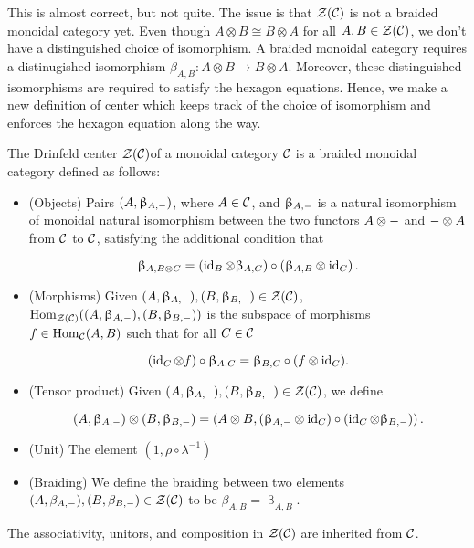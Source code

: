 This is almost correct, but not quite. The issue is that ${\mathcal Z}({\mathcal C})$ is not a braided monoidal category yet. Even though $A\otimes B\cong B\otimes A$ for all $A,B\in {\mathcal Z}({\mathcal C})$, we don't have a distinguished choice of isomorphism. A braided monoidal category requires a distinugished isomorphism $\beta_{A,B}:A\otimes B\xrightarrow{} B\otimes A$. Moreover, these distinguished isomorphisms are required to satisfy the hexagon equations. Hence, we make a new definition of center which keeps track of the choice of isomorphism and enforces the hexagon equation along the way.


\begin{defn} The Drinfeld center ${\mathcal Z}({\mathcal C})$of a monoidal category ${\mathcal C}$ is a braided monoidal category defined as follows:

\begin{itemize}
\item (Objects) Pairs $(A,\upbeta_{A,\--})$, where $A\in {\mathcal C}$, and $\upbeta_{A,\--}$ is a natural isomorphism of monoidal natural isomorphism between the two functors $A\otimes \--$ and $\--\otimes A$ from ${\mathcal C}$ to ${\mathcal C}$, satisfying the additional condition that

$$\upbeta_{A,B\otimes C}=\left(\operatorname{id}_{B}\otimes \upbeta_{A,C}\right)\circ \left(\upbeta_{A,B}\otimes \operatorname{id}_C\right).$$

\item (Morphisms) Given $(A,\upbeta_{A,\--}), (B,\upbeta_{B,\--})\in {\mathcal Z}({\mathcal C})$, $\operatorname{Hom}_{{\mathcal Z}({\mathcal C})}((A,\upbeta_{A,\--}),(B,\upbeta_{B,\--}))$ is the subspace of morphisms $f\in \operatorname{Hom}_{{\mathcal C}}(A,B)$ such that for all $C\in {\mathcal C}$

$$\left(\operatorname{id}_{C}\otimes f\right)\circ \upbeta_{A,C}=\upbeta_{B,C}\circ (f\otimes \operatorname{id}_C).$$

\item (Tensor product) Given $(A,\upbeta_{A,\--}), (B,\upbeta_{B,\--})\in {\mathcal Z}({\mathcal C})$, we define

$$(A,\upbeta_{A,\--})\otimes (B,\upbeta_{B,\--})=\left(A\otimes B, (\upbeta_{A,\--}\otimes \operatorname{id}_{C})\circ (\operatorname{id}_{C}\otimes \upbeta_{B,\--}) \right).$$

\item (Unit) The element $(1,\rho\circ \lambda^{-1})$

\item (Braiding) We define the braiding between two elements $(A,\beta_{A,\--}), (B,\beta_{B,\--})\in {\mathcal Z}({\mathcal C})$ to be $\beta_{A,B}=\upbeta_{A,B}$.
\end{itemize}

The associativity, unitors, and composition in ${\mathcal Z}({\mathcal C})$ are inherited from ${\mathcal C}$.
\end{defn}

